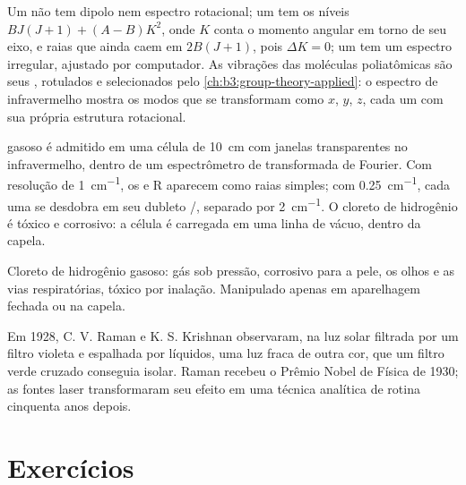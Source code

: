 Um  não tem dipolo nem espectro rotacional; um  tem
os níveis $BJ(J+1) + (A - B)K^2$, onde $K$ conta o momento angular em torno de seu eixo,
e raias que ainda caem em $2B(J+1)$, pois $\Delta K = 0$; um 
tem um espectro irregular, ajustado por computador. As vibrações das moléculas
poliatômicas são seus , rotulados e selecionados pelo
\cref{ch:b3:group-theory-applied}: o espectro de infravermelho mostra os modos
que se transformam como $x$, $y$, $z$, cada um com sua própria estrutura rotacional.

\begin{inthelab}
 gasoso é admitido em uma célula de \qty{10}{cm} com janelas transparentes
no infravermelho, dentro de um espectrômetro de transformada de Fourier. Com
resolução de \qty{1}{cm^{-1}}, os  e R aparecem como raias simples; com
\qty{0.25}{cm^{-1}}, cada uma se desdobra em seu dubleto /,
separado por \qty{2}{cm^{-1}}. O cloreto de hidrogênio é tóxico e corrosivo: a
célula é carregada em uma linha de vácuo, dentro da capela.
\end{inthelab}

\begin{safety}{}
Cloreto de hidrogênio gasoso: gás sob pressão, corrosivo para a pele, os olhos e
as vias respiratórias, tóxico por inalação. Manipulado apenas em aparelhagem
fechada ou na capela.
\end{safety}

\begin{history}[Raman, 1928]
Em 1928, C. V. Raman e K. S. Krishnan observaram, na luz solar filtrada por um
filtro violeta e espalhada por líquidos, uma luz fraca de outra cor, que um
filtro verde cruzado conseguia isolar. Raman recebeu o Prêmio Nobel de Física
de 1930; as fontes laser transformaram seu efeito em uma técnica analítica de
rotina cinquenta anos depois.
\end{history}

\section{Exercícios}

